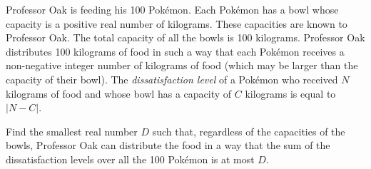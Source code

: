 Professor Oak is feeding his 100 Pok\'emon. Each Pok\'emon has a bowl whose capacity is a positive real number of kilograms. These capacities are known to Professor Oak. The total capacity of all the bowls is 100 kilograms. Professor Oak distributes 100 kilograms of food in such a way that each Pok\'emon receives a non-negative integer number of kilograms of food (which may be larger than the capacity of their bowl). The \emph{dissatisfaction level} of a Pok\'emon who received $N$ kilograms of food and whose bowl has a capacity of $C$ kilograms is equal to $|N - C|$.

Find the smallest real number $D$ such that, regardless of the capacities of the bowls, Professor Oak can distribute the food in a way that the sum of the dissatisfaction levels over all the 100 Pok\'emon is at most $D$.
